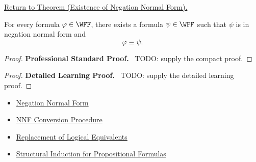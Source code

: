 \newpage
{}
\label{prf:existence-negation-normal-form-propositional-logic}

\begin{remark*}[Return]
\hyperref[thm:existence-negation-normal-form-propositional-logic]{Return to Theorem (Existence of Negation Normal Form).}
\end{remark*}

\begin{theorem*}
For every formula \(\varphi\in\WFF\), there exists a formula \(\psi\in\WFF\)
such that \(\psi\) is in negation normal form and
\[
\varphi\equiv\psi.
\]
\end{theorem*}

\begin{proof}
\textbf{Professional Standard Proof.}~
TODO: supply the compact proof.
\end{proof}

\begin{proof}
\textbf{Detailed Learning Proof.}~
TODO: supply the detailed learning proof.
\end{proof}

\begin{remark*}
\end{remark*}

\begin{dependencies}
\begin{itemize}
  \item \hyperref[def:negation-normal-form-propositional-logic]{Negation Normal Form}
  \item \hyperref[def:nnf-conversion-procedure-propositional-logic]{NNF Conversion Procedure}
  \item \hyperref[thm:replacement-of-logical-equivalents-propositional-logic]{Replacement of Logical Equivalents}
  \item \hyperref[thm:structural-induction-propositional-formulas]{Structural Induction for Propositional Formulas}
\end{itemize}
\end{dependencies}

\clearpage
